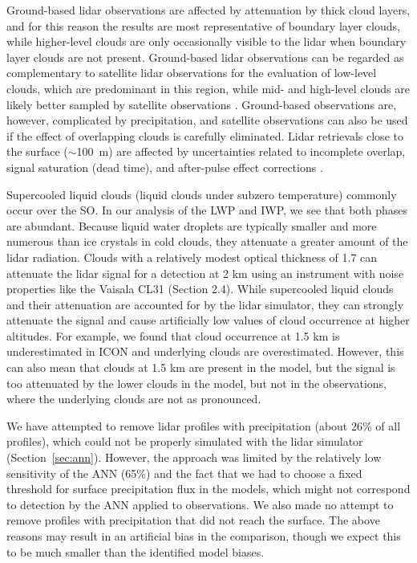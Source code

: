 \documentclass[draft]{agujournal2019}
\begin{document}
Ground-based lidar observations are affected by attenuation by thick cloud layers, and for this reason the results are most representative of boundary layer clouds, while higher-level clouds are only occasionally visible to the lidar when boundary layer clouds are not present. Ground-based lidar observations can be regarded as complementary to satellite lidar observations for the evaluation of low-level clouds, which are predominant in this region, while mid- and high-level clouds are likely better sampled by satellite observations \cite{mcerlich2021}. Ground-based observations are, however, complicated by precipitation, and satellite observations can also be used if the effect of overlapping clouds is carefully eliminated. Lidar retrievals close to the surface ($\sim$100~m) are affected by uncertainties related to incomplete overlap, signal saturation (dead time), and after-pulse effect corrections \cite{kuma2021}.

Supercooled liquid clouds (liquid clouds under subzero temperature) commonly occur over the SO. In our analysis of the LWP and IWP, we see that both phases are abundant. Because liquid water droplets are typically smaller and more numerous than ice crystals in cold clouds, they attenuate a greater amount of the lidar radiation. Clouds with a relatively modest optical thickness of 1.7 can attenuate the lidar signal for a detection at 2 km using an instrument with noise properties like the Vaisala CL31 (Section 2.4). While supercooled liquid clouds and their attenuation are accounted for by the lidar simulator, they can strongly attenuate the signal and cause artificially low values of cloud occurrence at higher altitudes. For example, we found that cloud occurrence at 1.5 km is underestimated in ICON and underlying clouds are overestimated. However, this can also mean that clouds at 1.5 km are present in the model, but the signal is too attenuated by the lower clouds in the model, but not in the observations, where the underlying clouds are not as pronounced.

We have attempted to remove lidar profiles with precipitation (about 26\% of all profiles), which could not be properly simulated with the lidar simulator (Section~\ref{sec:ann}). However, the approach was limited by the relatively low sensitivity of the ANN (65\%) and the fact that we had to choose a fixed threshold for surface precipitation flux in the models, which might not correspond to detection by the ANN applied to observations. We also made no attempt to remove profiles with precipitation that did not reach the surface. The above reasons may result in an artificial bias in the comparison, though we expect this to be much smaller than the identified model biases.
\end{document}
